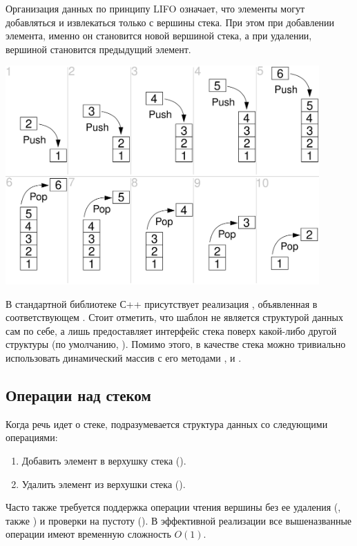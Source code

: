 Организация данных по принципу LIFO означает, что элементы могут добавляться и извлекаться только с вершины стека. При этом при добавлении
элемента, именно он становится новой вершиной стека, а при удалении, вершиной становится предыдущий элемент.

\includegraphics[width=0.9\textwidth]{resources/19-26/stack.png}

В стандартной библиотеке С++ присутствует реализация , объявленная в соответствующем
. Стоит отметить, что шаблон  не является
структурой данных сам по себе, а лишь предоставляет интерфейс стека поверх какой-либо другой структуры (по умолчанию, ).
Помимо этого, в качестве стека можно тривиально использовать динамический массив  с его
методами ,  и .
\subsection{Операции над стеком}
Когда речь идет о стеке, подразумевается структура данных со следующими операциями:
\begin{enumerate}
  \item Добавить элемент в верхушку стека ().
  \item Удалить элемент из верхушки стека ().
\end{enumerate}

Часто также требуется поддержка операции чтения вершины без ее удаления (, также ) и
проверки на пустоту (). В эффективной реализации все вышеназванные операции имеют временную сложность
\(O(1)\).

